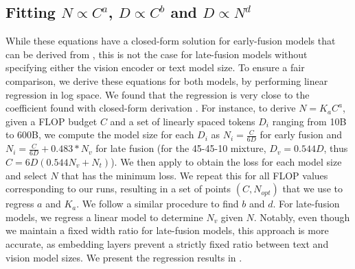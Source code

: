 \subsection{Fitting \(N \propto C^a\), \(D \propto C^b\) and \(D \propto N^d\)}  
While these equations have a closed-form solution \citep{hoffmann2022training} for early-fusion models that can be derived from , this is not the case for late-fusion models without specifying either the vision encoder or text model size. To ensure a fair comparison, we derive these equations for both models, by performing linear regression in log space. We found that the regression is very close to the coefficient found with closed-form derivation . For instance, to derive \(N = K_aC^a\), given a FLOP budget \(C\) and a set of linearly spaced tokens \(D_i\) ranging from 10B to 600B, we compute the model size for each \(D_i\) as \(N_i = \frac{C}{6D}\) for early fusion and \(N_i = \frac{C}{6D}+0.483*N_v\) for late fusion (for the 45-45-10 mixture, \(D_v=0.544D\), thus $C=6D(0.544N_v+N_t)$). We then apply  to obtain the loss for each model size and select \(N\) that has the minimum loss. We repeat this for all FLOP values corresponding to our runs, resulting in a set of points \((C, N_{opt})\) that we use to regress \(a\) and \(K_a\).  We follow a similar procedure to find \(b\) and \(d\). For late-fusion models, we regress a linear model to determine \(N_v\) given \(N\). Notably, even though we maintain a fixed width ratio for late-fusion models, this approach is more accurate, as embedding layers prevent a strictly fixed ratio between text and vision model sizes. We present the regression results in .


\begin{table}[htb]
    \centering
    \setlength{\tabcolsep}{16pt} %
    \renewcommand{\arraystretch}{1} %
    \caption{\textbf{Scaling laws parameters for early-fusion.} Doing regression to derive the scaling laws coefficients leads to very close results to using the closed-form solution.}
    \label{tab:scaling_laws_closed_form}
\end{table}


